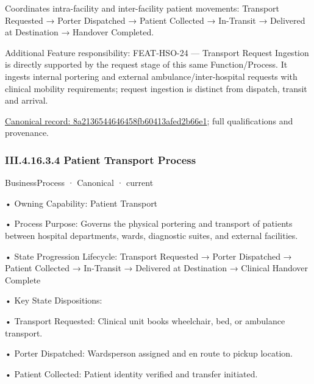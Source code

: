 Coordinates intra-facility and inter-facility patient movements: Transport Requested → Porter Dispatched → Patient Collected → In-Transit → Delivered at Destination → Handover Completed.



Additional Feature responsibility: FEAT-HSO-24 — Transport Request Ingestion is directly supported by the request stage of this same Function/Process. It ingests internal portering and external ambulance/inter-hospital requests with clinical mobility requirements; request ingestion is distinct from dispatch, transit and arrival.


{\footnotesize \href{../../../../../../../../continuum/business/business-function/8a2136544646458fb60413afed2b66e1.md}{Canonical record: 8a2136544646458fb60413afed2b66e1}; full qualifications and provenance.}\par
\subsubsection*{III.4.16.3.4 Patient Transport Process}
\label{navigation:III.4.16.3.4}

\label{element:f2e58fd18cd94b0faaa364d3890a7c9e}
{\small BusinessProcess · Canonical · current}\par

•
Owning Capability: Patient Transport



•
Process Purpose: Governs the physical portering and transport of patients between hospital departments, wards, diagnostic suites, and external facilities.



•
State Progression Lifecycle: Transport Requested → Porter Dispatched → Patient Collected → In-Transit → Delivered at Destination → Clinical Handover Complete



•
Key State Dispositions:



•
Transport Requested: Clinical unit books wheelchair, bed, or ambulance transport.



•
Porter Dispatched: Wardsperson assigned and en route to pickup location.



•
Patient Collected: Patient identity verified and transfer initiated.



